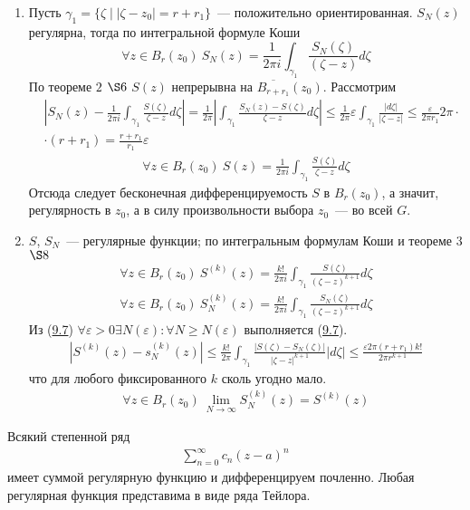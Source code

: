 \begin{enumerate}
    \item Пусть $\gamma_1 = \{\zeta \mid \left| \zeta - z_0 \right| =
    r+r_1\}$~--- положительно ориентированная.
    $S_N(z)$ регулярна, тогда по интегральной формуле Коши
    \begin{equation}\label{(9.9)}
        \forall z \in B_r(z_0) \ S_N(z) = \frac{1}{2 \pi i}\int_{\gamma_1}\frac{S_N(\zeta)}{(\zeta - z)}d \zeta
    \end{equation}
    По теореме $2$ $\S 6$ $S(z)$ непрерывна на $\overline{B_{r+r_1}}(z_0)$.
    Рассмотрим
    \begin{align*}
      & \left| S_N(z) - \frac{1}{2 \pi i}\int_{\gamma_1}\frac{S(\zeta)}{\zeta - z} d\zeta \right| = \frac{1}{2 \pi}\left| \int_{\gamma_1} \frac{S_N(z) - S(\zeta)}{\zeta - z} d \zeta \right| \leq \frac{1}{2 \pi} \varepsilon \int_{\gamma_1}\frac{\left| d \zeta \right|}{\left| \zeta - z \right|} \leq \frac{\varepsilon}{2 \pi r_1}2 \pi \cdot \\
      & \cdot (r+r_1) = \frac{r+r_1}{r_1}\varepsilon
    \end{align*}
    \begin{align*}
      \forall z \in B_r(z_0) \ S(z) = \frac{1}{2\pi i}\int_{\gamma_1}\frac{S(\zeta)}{\zeta - z}d\zeta
    \end{align*}
    Отсюда следует бесконечная дифференцируемость $S$ в $B_r(z_0)$, а значит,
    регулярность в $z_0$, а в силу произвольности выбора $z_0$~--- во всей $G$.
    \item $S$, $S_N$~--- регулярные функции; по интегральным формулам Коши и
    теореме $3$ $\S 8$
    \begin{align*}
      \forall z \in B_r(z_0) \ S^{(k)}(z) = \frac{k!}{2 \pi i} \int_{\gamma_1} \frac{S(\zeta)}{(\zeta - z)^{k+1}}d\zeta
    \end{align*}
    \begin{align*}
      \forall z \in B_r(z_0) \ S_N^{(k)}(z) = \frac{k!}{2 \pi i}\int_{\gamma_1}\frac{S_N(\zeta)}{(\zeta - z)^{k+1}} d \zeta 
    \end{align*}
    Из (\href{(9.7)}{9.7}) $\forall \varepsilon > 0 \exists N(\varepsilon):
    \forall N\geq N(\varepsilon)$ выполняется (\href{(9.7)}{9.7}).
    \begin{align*}
      \left| S^{(k)}(z) - s_N^{(k)}(z) \right| \leq \frac{k!}{2\pi}\int_{\gamma_1}\frac{\left| S(\zeta) - S_N(\zeta) \right|}{\left| \zeta - z \right|^{k+1}} \left| d\zeta \right|\leq \frac{\varepsilon 2 \pi (r+r_1)k!}{2 \pi r^{k+1}}
    \end{align*}
    что для любого фиксированного $k$ сколь угодно мало.
    \begin{align*}
      \forall z \in B_r(z_0) \ \lim_{N \to \infty}S^{(k)}_N (z) = S^{(k)}(z)
    \end{align*}
\end{enumerate}
\corollary
Всякий степенной ряд
\begin{align*}
  \sum_{n=0}^{\infty}c_n(z-a)^n
\end{align*}
имеет суммой регулярную функцию и дифференцируем почленно.
\corollary
Любая регулярная функция представима в виде ряда Тейлора.
